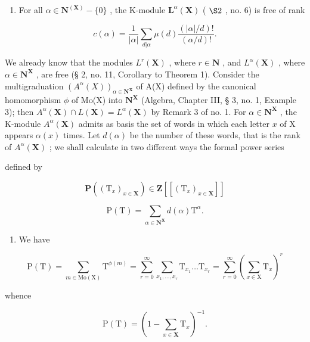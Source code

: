 \begin{enumerate}
\def\labelenumi{(\alph{enumi})}
\setcounter{enumi}{1}
\tightlist
\item
  For all \(\alpha \in \mathbf{N}^{(\mathbf{X})} - \{0\}\) , the K-module \(\mathbf{L}^{\alpha}(\mathbf{X})\) ( \(\S 2\) , no. 6) is free of rank
\end{enumerate}

\[
c (\alpha) = \frac {1}{| \alpha |} \sum_ {d | \alpha} \mu (d) \frac {(| \alpha | / d) !}{(\alpha / d) !}.\tag{16}
\]

We already know that the modules \(L^{r}(\mathbf{X})\) , where \(r \in \mathbf{N}\) , and \(L^{\alpha}(\mathbf{X})\) , where \(\alpha \in \mathbf{N}^{\mathbf{X}}\) , are free (§ 2, no. 11, Corollary to Theorem 1). Consider the multigraduation \((A^{\alpha}(X))_{\alpha \in \mathbf{N}^{\mathbf{X}}}\) of A(X) defined by the canonical homomorphism \(\phi\) of Mo(X) into \(\mathbf{N}^{\mathbf{X}}\) (Algebra, Chapter III, § 3, no. 1, Example 3); then \(A^{\alpha}(\mathbf{X}) \cap L(\mathbf{X}) = L^{\alpha}(\mathbf{X})\) by Remark 3 of no. 1. For \(\alpha \in \mathbf{N}^{\mathbf{X}}\) , the K-module \(A^{\alpha}(\mathbf{X})\) admits as basis the set of words in which each letter \(x\) of X appears \(\alpha(x)\) times. Let \(d(\alpha)\) be the number of these words, that is the rank of \(A^{\alpha}(\mathbf{X})\) ; we shall calculate in two different ways the formal power series

defined by

\[
\mathbf {P} ((\mathrm{T} _ {x}) _ {x \in \mathbf {X}}) \in \mathbf {Z} [ [ (\mathrm{T} _ {x}) _ {x \in \mathbf {X}} ] ]\tag{17}
\]

\[
\mathrm{P} (\mathrm{T}) = \sum_ {\alpha \in \mathbf {N} ^ {\mathbf {X}}} d (\alpha) \mathrm{T} ^ {\alpha}.
\]

\begin{enumerate}
\def\labelenumi{(\arabic{enumi})}
\tightlist
\item
  We have
\end{enumerate}

\[
\mathrm{P} (\mathrm{T}) = \sum_ {m \in \mathrm{Mo} (\mathrm{X})} \mathrm{T} ^ {\phi (m)} = \sum_ {r = 0} ^ {\infty} \sum_ {x _ {1}, \dots , x _ {r}} \mathrm{T} _ {x _ {1}} \dots \mathrm{T} _ {x _ {r}} = \sum_ {r = 0} ^ {\infty} \left(\sum_ {x \in \mathrm{X}} \mathrm{T} _ {x}\right) ^ {r}
\]

whence

\[
\mathrm{P} (\mathrm{T}) = \left(1 - \sum_ {x \in \mathbf {X}} \mathrm{T} _ {x}\right) ^ {- 1}.\tag{18}
\]

